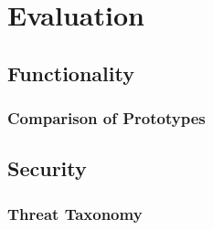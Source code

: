 \chapter{Evaluation}

\section{Functionality}

\subsection{Comparison of Prototypes}

\section{Security}

\subsection{Threat Taxonomy}